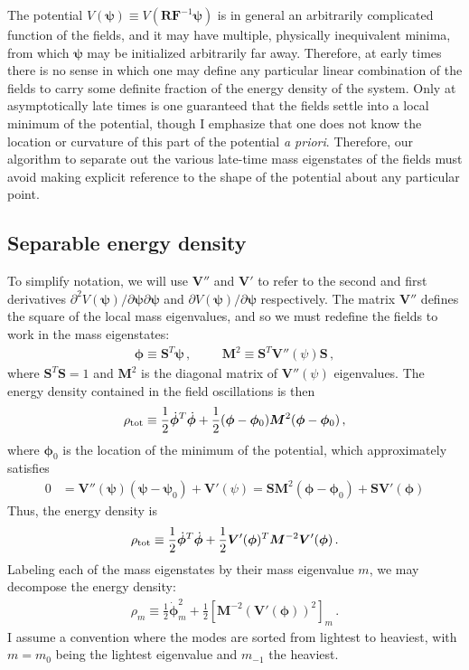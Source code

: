\documentclass{article}
\begin{document}
The potential $V(\bm\psi)\equiv V(\bm R\bm F^{-1}\bm\psi)$ is in general an arbitrarily complicated function of the fields, and it may have multiple, physically inequivalent minima, from which $\bm\psi$ may be initialized arbitrarily far away. Therefore, at early times there is no sense in which one may define any particular linear combination of the fields to carry some definite fraction of the energy density of the system. Only at asymptotically late times is one guaranteed that the fields settle into a local minimum of the potential, though I emphasize that one does not know the location or curvature of this part of the potential \emph{a priori}. Therefore, our algorithm to separate out the various late-time mass eigenstates of the fields must avoid making explicit reference to the shape of the potential about any particular point.


\subsection{Separable energy density}\label{sec:separable-energy-density}
To simplify notation, we will use $\bm V''$ and $\bm V'$ to refer to the second and first derivatives $\partial^2 V(\bm\psi)/\partial\bm\psi\partial\bm\psi$ and $\partial V(\bm\psi)/\partial\bm\psi$ respectively. The matrix $\bm V''$ defines the square of the local mass eigenvalues, and so we must redefine the fields to work in the mass eigenstates:
\begin{align}
    \bm\phi\equiv \bm S^T\bm\psi \,,\hspace{1cm} \bm M^2\equiv \bm S^T\bm V''(\psi)\bm S\,,
\end{align}
where $\bm S^T\bm S = 1$ and $\bm M^2$ is the diagonal matrix of $\bm V''(\psi)$ eigenvalues. The energy density contained in the field oscillations is then
\begin{align}
    \rho_{\rm tot}\equiv \frac12 \dot{\bm\phi}^T\dot{\bm\phi} + \frac12 (\bm\phi - \bm\phi_0)\bm M^2(\bm\phi - \bm\phi_0)\,,
\end{align}
where $\bm\phi_0$ is the location of the minimum of the potential, which approximately satisfies
\begin{align}
    0&=\bm V''(\bm\psi)(\bm \psi - \bm\psi_0) + \bm V'(\psi) = \bm S \bm M^2 (\bm\phi - \bm \phi_0) + \bm S\bm V'(\bm\phi)
\end{align}
Thus, the energy density is
\begin{align}
    \rho_{\rm tot}\equiv \frac12 \dot{\bm\phi}^T\dot{\bm\phi} + \frac12\bm V'(\bm\phi)^T\bm M^{-2}\bm V'(\bm\phi)\,.
\end{align}
Labeling each of the mass eigenstates by their mass eigenvalue $m$, we may decompose the energy density:
\begin{align}\label{eqn:separated-energy-densities}
    \rho_{m}\equiv \frac12 \dot{\bm\phi}_m^2 + \frac12 [\bm M^{-2}(\bm V'(\bm\phi))^2]_m\,.
\end{align}
I assume a convention where the modes are sorted from lightest to heaviest, with $m = m_0$ being the lightest eigenvalue and $m_{-1}$ the heaviest.
\end{document}
